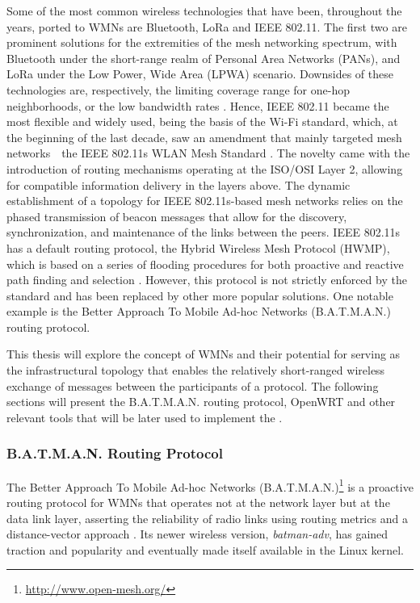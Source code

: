 Some of the most common wireless technologies that have been, throughout the years, ported to WMNs are Bluetooth, LoRa and IEEE 802.11. The first two are prominent solutions for the extremities of the mesh networking spectrum, with Bluetooth under the short-range realm of Personal Area Networks (PANs), and LoRa  under the Low Power, Wide Area (LPWA) scenario. Downsides of these technologies are, respectively, the limiting coverage range for one-hop neighborhoods, or the low bandwidth rates \cite{cilfone2019wireless}. Hence, IEEE 802.11 became the most flexible and widely used, being the basis of the Wi-Fi standard, which, at the beginning of the last decade, saw an amendment that mainly targeted mesh networks~\textemdash~the IEEE 802.11s WLAN Mesh Standard \cite{hiertz2010ieee}. The novelty came with the introduction of routing mechanisms operating at the ISO/OSI Layer 2, allowing for compatible information delivery in the layers above. The dynamic establishment of a topology for IEEE 802.11s-based mesh networks relies on the phased transmission of beacon messages that allow for the discovery, synchronization, and maintenance of the links between the peers. IEEE 802.11s has a default routing protocol, the Hybrid Wireless Mesh Protocol (HWMP), which is based on a series of flooding procedures for both proactive and reactive path finding and selection \cite{bari2012performance}. However, this protocol is not strictly enforced by the standard and has been replaced by other more popular solutions. One notable example is the Better Approach To Mobile Ad-hoc Networks (B.A.T.M.A.N.) routing protocol.

This thesis will explore the concept of WMNs and their potential for serving as the infrastructural topology that enables the relatively short-ranged wireless exchange of messages between the participants of a \pol{} protocol. The following sections will present the B.A.T.M.A.N. routing protocol, OpenWRT and other relevant tools that will be later used to implement the \poc{}.

\subsubsection{B.A.T.M.A.N. Routing Protocol}

The Better Approach To Mobile Ad-hoc Networks (B.A.T.M.A.N.)\footnote{\url{http://www.open-mesh.org/}} is a proactive routing protocol for WMNs that operates not at the network layer but at the data link layer, asserting the reliability of radio links using routing metrics and a distance-vector approach \cite{seither2011routing}. Its newer wireless version, \emph{batman-adv}, has gained traction and popularity and eventually made itself available in the Linux kernel.

